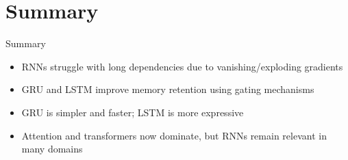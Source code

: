 \section{Summary}
\begin{frame}{Summary}
  \small
  \begin{itemize}
    \item RNNs struggle with long dependencies due to vanishing/exploding gradients
    \item GRU and LSTM improve memory retention using gating mechanisms
    \item GRU is simpler and faster; LSTM is more expressive
    \item Attention and transformers now dominate, but RNNs remain relevant in many domains
  \end{itemize}
\end{frame}
